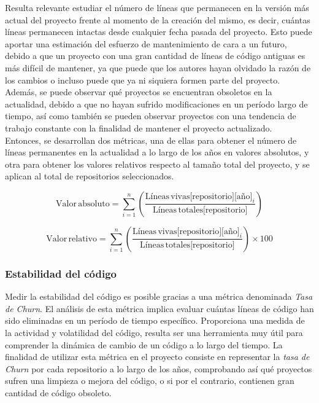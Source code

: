 \documentclass[a4paper, 12pt]{book}
\begin{document}
Resulta relevante estudiar el número de líneas que permanecen en la versión más actual del proyecto frente al momento de la creación del mismo, es decir, cuántas líneas permanecen intactas desde cualquier fecha pasada del proyecto. 
Esto puede aportar una estimación del esfuerzo de mantenimiento de cara a un futuro, debido a que un proyecto con una gran cantidad de líneas de código antiguas es más difícil de mantener, ya que puede que los autores 
hayan olvidado la razón de los cambios o incluso puede que ya ni siquiera formen parte del proyecto. Además, se puede observar qué proyectos se encuentran obsoletos en la actualidad, debido a que no hayan sufrido
modificaciones en un período largo de tiempo, así como también se pueden observar proyectos con una tendencia de trabajo constante con la finalidad de mantener el proyecto actualizado.
\\Entonces, se desarrollan dos métricas, una de ellas para obtener el número de líneas permanentes en la actualidad a lo largo de los años en valores absolutos, y otra para obtener los valores relativos respecto al tamaño total
del proyecto, y se aplican al total de repositorios seleccionados.

\[\text{Valor} \, \text{absoluto} = \sum_{i=1}^{n} \left( \frac{\text{Líneas} \, \text{vivas[repositorio][año]}_i}{\text{Líneas} \, \text{totales[repositorio]}} \right)\]

\[\text{Valor} \, \text{relativo} = \sum_{i=1}^{n} \left( \frac{\text{Líneas} \, \text{vivas[repositorio][año]}_i}{\text{Líneas} \, \text{totales[repositorio]}} \right) \times 100 \]


\subsubsection{Estabilidad del código}
\label{subsubsec:estabilidad-codigo}

Medir la estabilidad del código es posible gracias a una métrica denominada \textit{Tasa de Churn}. El análisis de esta métrica implica evaluar cuántas líneas de código han sido eliminadas en un período de tiempo específico.
Proporciona una medida de la actividad y volatilidad del código, resulta ser una herramienta muy útil para comprender la dinámica de cambio de un código a lo largo del tiempo. La finalidad de utilizar esta métrica en el proyecto
consiste en representar la \textit{tasa de Churn} por cada repositorio a lo largo de los años, comprobando así qué proyectos sufren una limpieza o mejora del código, o si por el contrario, contienen gran cantidad de código obsoleto.
\end{document}
